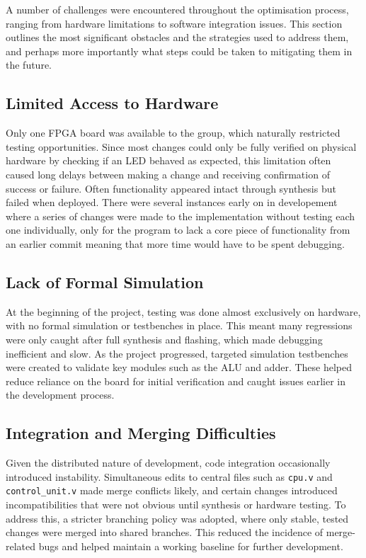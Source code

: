 \documentclass[a4paper,10pt]{article}
\begin{document}
A number of challenges were encountered throughout the optimisation process, 
ranging from hardware limitations to software integration issues. 
This section outlines the most significant obstacles and 
the strategies used to address them,
and perhaps more importantly what steps could be taken to mitigating
them in the future.

\subsection*{Limited Access to Hardware}

Only one FPGA board was available to the group, 
which naturally restricted testing opportunities. 
Since most changes could only be fully verified on physical hardware 
by checking if an LED behaved as expected,
this limitation often caused long delays between making a change 
and receiving confirmation of success or failure. 
Often functionality appeared intact through synthesis 
but failed when deployed. 
There were several instances early on in developement where 
a series of changes were made to the implementation 
without testing each one individually,
only for the program to lack a core piece of functionality from an earlier commit
meaning that more time would have to be spent debugging.

\subsection*{Lack of Formal Simulation}

At the beginning of the project, testing was done almost exclusively on hardware, 
with no formal simulation or testbenches in place. 
This meant many regressions were only caught after full synthesis and flashing, 
which made debugging inefficient and slow. As the project progressed, 
targeted simulation testbenches were created to validate key modules 
such as the ALU and adder. 
These helped reduce reliance on the board for initial verification and 
caught issues earlier in the development process.

\subsection*{Integration and Merging Difficulties}

Given the distributed nature of development, 
code integration occasionally introduced instability. 
Simultaneous edits to central files such as \texttt{cpu.v} and \texttt{control\_unit.v} 
made merge conflicts likely, and certain changes introduced incompatibilities 
that were not obvious until synthesis or hardware testing. 
To address this, a stricter branching policy was adopted, 
where only stable, tested changes were merged into shared branches. 
This reduced the incidence of merge-related bugs and 
helped maintain a working baseline for further development.
\end{document}
